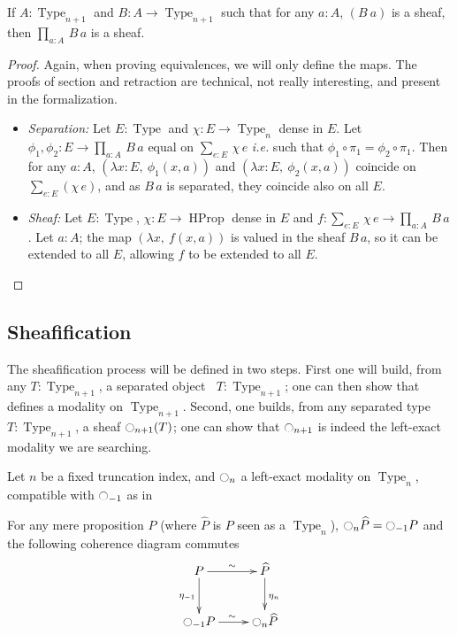 \documentclass[notfinal]{jfrarticle}
\DeclareMathOperator{\Type}{Type}
\DeclareMathOperator{\HProp}{HProp}
\newcommand{\modal}{\ensuremath{\ocircle}}
\newcommand \separated {\mathop{\square_{n+1}} }
\newcommand{\sumD}[3]{\sum_{#1:#2}\, #3}
\newcommand{\prodD}[3]{\prod_{#1:#2}\, #3}
\newcommand{\code}[1]{\texttt{#1}}
\newcommand{\ie}{\emph{i.e.}}
\begin{document}
\begin{prop}[\thethm\ (\code{dep\_prod\_SnType\_j\_Type})]
\label{prop:sheaf-forall}
  If $A:\Type_{n+1}$ and $B:A \to \Type_{n+1}$ such that for any
  $a:A$, $(B~a)$ is a sheaf, then $\prodD a A {B\, a}$ is a sheaf.
\end{prop}
\begin{proof}
  Again, when proving equivalences, we will only define the maps. The
  proofs of section and retraction are technical, not really
  interesting, and present in the formalization.
  \begin{itemize}
  \item {\em Separation:} Let $E:\Type$ and $\chi:E \to \Type_n$ dense
    in $E$. Let $\phi_1,\phi_2:E\to \prodD a A {B\, a}$ equal on
    $\sumD e E{\chi\, e}$ \ie{} such that $\phi_1\circ \pi_1 = \phi_2\circ
    \pi_1$.
    Then for any $a:A$, $(\lambda x:E,~\phi_1(x, a))$
    and $(\lambda x:E,~\phi_2(x,a))$
    coincide on $\sum_{e:E}(\chi\, e)$, and as $B\, a$ is separated,
    they coincide also on all $E$.
  \item {\em Sheaf:} Let $E:\Type$, $\chi:E\to \HProp$ dense in $E$ and
    $f:\sumD e E {\chi\, e}\to \prodD a A{B\,a}$. Let $a:A$; the
    map $(\lambda x,~f(x,a))$ is valued in the sheaf $B\, a$, so it
    can be extended to all $E$, allowing $f$ to be extended to all
    $E$.
  \end{itemize}
\end{proof}

\subsection{Sheafification}
\label{ssec:sheafification}

The sheafification process will be defined in two steps. First
one will build, from any $T:\Type_{n+1}$, a separated object $\separated
T:\Type_{n+1}$; one can then show that $\separated$ defines a modality on
$\Type_{n+1}$. Second, one builds, from any separated type
$T:\Type_{n+1}$, a sheaf $\modal_{n+1}(T)$; one can show that
$\modal_{n+1}$ is indeed the left-exact modality we are searching.

Let $n$ be a fixed truncation index, and $\modal_n$ a left-exact
modality on $\Type_n$, compatible with $\modal_{-1}$ as in
\begin{cond}\label{cond:hprop}
  For any mere proposition $P$ (where $\widehat P$ is $P$ seen as a
  $\Type_n$),  $\modal_n \widehat P = \modal_{-1} P$ and the
  following coherence diagram commutes
  \[\xymatrix{
    P \ar@{->}^{\sim}[r] \ar[d]_{\eta_{-1}} & \widehat P \ar[d]^{\eta_n} \\
    \modal_{-1} P \ar@{->}^{\sim}[r] & \modal_n \widehat P 
  }\]
\end{cond}
\end{document}
